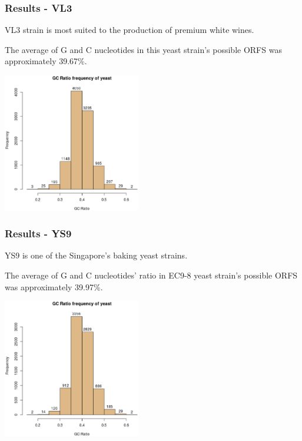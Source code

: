 \documentclass{beamer}
\begin{document}
\begin{frame}
\frametitle{Results - VL3}

VL3 strain is most suited to the production of premium white wines.

The average of G and C nucleotides in this yeast strain's possible ORFS was approximately 39.67\%.
\begin{minipage}{0.5\textwidth}
\includegraphics[width=60mm]{images/VL3_AWRI_2011_AEJS01000000.eps}
\end{minipage}
\end{frame}


\begin{frame}
\frametitle{Results - YS9}

YS9 is one of the Singapore's baking yeast strains.

The average of G and C nucleotides' ratio in EC9-8 yeast strain's possible ORFS was approximately 39.97\%.

\begin{minipage}{0.4\textwidth}
\includegraphics[width=60mm]{images/YS9_Stanford_2014_JRIB00000000.eps}
\end{minipage}
\end{frame}
\end{document}
